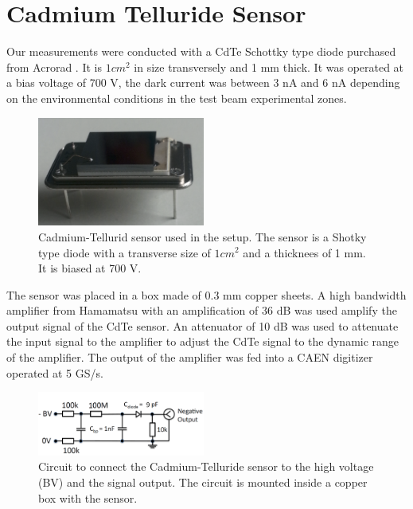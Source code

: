 %
%
%
\section{Cadmium Telluride Sensor}
\label{sec:siliconpad}

Our measurements were conducted with a CdTe Schottky type diode purchased from Acrorad \cite{acrorad}. It is $1 cm^2$ in size transversely and 1 mm thick.
It was operated at a bias voltage of 700 V, the dark current was between 3 nA and 6 nA depending on the environmental conditions in the test beam experimental zones.     

\begin{figure}[htbp] 
\centering
\includegraphics[width=0.49\textwidth]{figures/CdTeSensor.png} 
\caption{Cadmium-Tellurid sensor used in the setup. The sensor is a Shotky type diode with a transverse size of $1 cm^2$ and a thicknees of 1 mm. It is biased at 700 V.} 
\label{fig:CdTeSensor} 
\end{figure} 


The sensor was placed in a box made of 0.3 mm copper sheets. 
A high bandwidth amplifier from Hamamatsu with an amplification of 36 dB was used amplify the output signal of the CdTe sensor.
An attenuator of 10 dB was used to attenuate the input signal to the amplifier to adjust the CdTe signal to the dynamic range of the amplifier.
The output of the amplifier was fed into a CAEN digitizer operated at 5 GS/s.

\begin{figure}[htbp] 
\centering
\includegraphics[width=0.49\textwidth]{figures/circuit_CdTe.png} 
\caption{Circuit to connect the Cadmium-Telluride sensor to the high voltage (BV) and the signal output. The circuit is mounted inside a copper box with the sensor.} 
\label{fig:CdTeSensor} 
\end{figure} 

